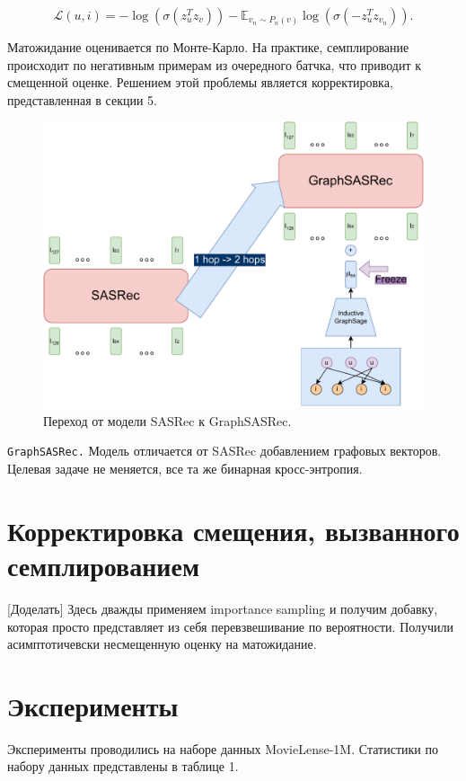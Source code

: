 \documentclass{article}
\begin{document}
$$
\mathcal{L}(u, i) = - \log(\sigma(z_u^T z_v)) - \mathbb{E}_{v_n \sim P_n(v)} \log (\sigma(-z^T_u z_{v_n})).
$$

Матожидание оценивается по Монте-Карло. На практике, семплирование происходит по негативным примерам из очередного батчка, что приводит
к смещенной оценке. Решением этой проблемы является корректировка, представленная в секции 5.

\begin{figure}[!ht]
    \centering
    \includegraphics[width=150mm]{images/grpahsasrec2.pdf}
    \caption{Переход от модели SASRec к GraphSASRec.}
\end{figure}

\texttt{GraphSASRec.} Модель отличается от SASRec добавлением графовых векторов. Целевая задаче не меняется, все та же бинарная кросс-энтропия.

\section{Корректировка смещения, вызванного семплированием}

[Доделать] Здесь дважды применяем importance sampling и получим добавку, которая просто представляет из себя перевзвешивание по
вероятности. Получили асимптотичевски несмещенную оценку на матожидание.

\section{Эксперименты}

Эксперименты проводились на наборе данных MovieLense-1M. Статистики по набору данных представлены в 
таблице 1.
\end{document}
